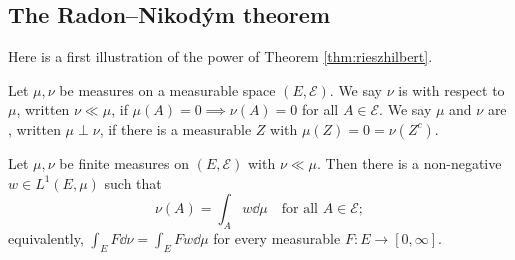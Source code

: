\documentclass[a4paper]{scrartcl}
\begin{document}
\subsection{The Radon--Nikod\'ym theorem}

Here is a first illustration of the power of Theorem \ref{thm:rieszhilbert}.

\begin{definition}
	Let $\mu, \nu$ be measures on a measurable space $(E, \mathcal{E})$. We say $\nu$ is  with respect to $\mu$, written $\nu \ll \mu$, if $\mu(A) = 0 \implies \nu(A) = 0$ for all $A \in \mathcal{E}$. We say $\mu$ and $\nu$ are , written $\mu \perp \nu$, if there is a measurable $Z$ with $\mu(Z) = 0 = \nu(Z^c)$.
\end{definition}

\begin{theorem}\label{thm:radonnikodym}
	Let $\mu, \nu$ be finite measures on $(E,\mathcal{E})$ with $\nu \ll \mu$. Then there is a non-negative $w \in L^1(E,\mu)$ such that
	$$\nu(A) = \int_A w \dd \mu \quad \text{for all } A \in \mathcal{E};$$
	equivalently, $\int_E F \dd \nu = \int_E F w \dd\mu$ for every measurable $F : E \to [0,\infty]$.
\end{theorem}
\end{document}
